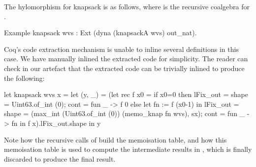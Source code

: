 \documentclass[a4paper,anonymous, UKenglish,cleveref, autoref, thm-restate]{lipics-v2021}
\begin{document}
The hylomorphism for knapsack is as follows, where  is the
recursive coalgebra for .
\begin{coqcode}
Example knapsack wvs : Ext (dyna (knapsackA wvs) out_nat).
\end{coqcode}
Coq's code extraction mechanism is unable to inline several definitions in this
case. We have manually inlined the extracted code for simplicity. The reader
can check in our artefact that the extracted code can be trivially
inlined to produce the following:
\begin{ocamlcode}
let knapsack wvs x = let (y, _) = (let rec f x0 =
      if x0=0 then
        { lFix_out = {shape = Uint63.of_int (0); cont  = fun _ -> f 0 } }
      else let fn := f (x0-1) in { lFix_out = {
           shape = (max_int (Uint63.of_int (0)) (memo_knap fn wvs), sx);
           cont = fun _ -> fn } }
     in f x).lFix_out.shape in y
\end{ocamlcode}
Note how the recursive calls of  build the memoisation table, and how
this memoisation table is used to compute the intermediate results in
, which is finally discarded to produce the final result.
\end{document}
